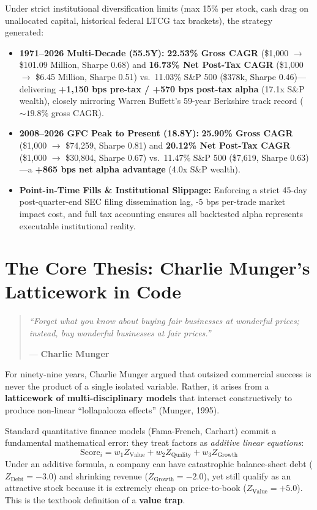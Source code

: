\documentclass[10pt,twocolumn]{article}
\begin{document}
Under strict institutional diversification limits (max 15\% per stock, cash drag on unallocated capital, historical federal LTCG tax brackets), the strategy generated:
\begin{itemize}
    \item \textbf{1971--2026 Multi-Decade (55.5Y):} \textbf{22.53\% Gross CAGR} (\$1,000 $\to$ \$101.09 Million, Sharpe 0.68) and \textbf{16.73\% Net Post-Tax CAGR} (\$1,000 $\to$ \$6.45 Million, Sharpe 0.51) vs.\ 11.03\% S\&P 500 (\$378k, Sharpe 0.46)---delivering \textbf{+1,150 bps pre-tax / +570 bps post-tax alpha} (17.1x S\&P wealth), closely mirroring Warren Buffett's 59-year Berkshire track record ($\sim 19.8\%$ gross CAGR).
    \item \textbf{2008--2026 GFC Peak to Present (18.8Y):} \textbf{25.90\% Gross CAGR} (\$1,000 $\to$ \$74,259, Sharpe 0.81) and \textbf{20.12\% Net Post-Tax CAGR} (\$1,000 $\to$ \$30,804, Sharpe 0.67) vs.\ 11.47\% S\&P 500 (\$7,619, Sharpe 0.63)---a \textbf{+865 bps net alpha advantage} (4.0x S\&P wealth).
    \item \textbf{Point-in-Time Fills \& Institutional Slippage:} Enforcing a strict 45-day post-quarter-end SEC filing dissemination lag, -5 bps per-trade market impact cost, and full tax accounting ensures all backtested alpha represents executable institutional reality.
\end{itemize}

\section{The Core Thesis: Charlie Munger's Latticework in Code}
\begin{quote}
\small\itshape ``Forget what you know about buying fair businesses at wonderful prices; instead, buy wonderful businesses at fair prices.''
\par\hfill\upshape --- \textbf{Charlie Munger}
\end{quote}
For ninety-nine years, Charlie Munger argued that outsized commercial success is never the product of a single isolated variable. Rather, it arises from a \textbf{latticework of multi-disciplinary models} that interact constructively to produce non-linear ``lollapalooza effects'' (Munger, 1995).

Standard quantitative finance models (Fama-French, Carhart) commit a fundamental mathematical error: they treat factors as \textit{additive linear equations}:
\begin{equation}
    \text{Score}_i = w_1 Z_{\text{Value}} + w_2 Z_{\text{Quality}} + w_3 Z_{\text{Growth}}
\end{equation}
Under an additive formula, a company can have catastrophic balance-sheet debt ($Z_{\text{Debt}} = -3.0$) and shrinking revenue ($Z_{\text{Growth}} = -2.0$), yet still qualify as an attractive stock because it is extremely cheap on price-to-book ($Z_{\text{Value}} = +5.0$). This is the textbook definition of a \textbf{value trap}.
\end{document}
